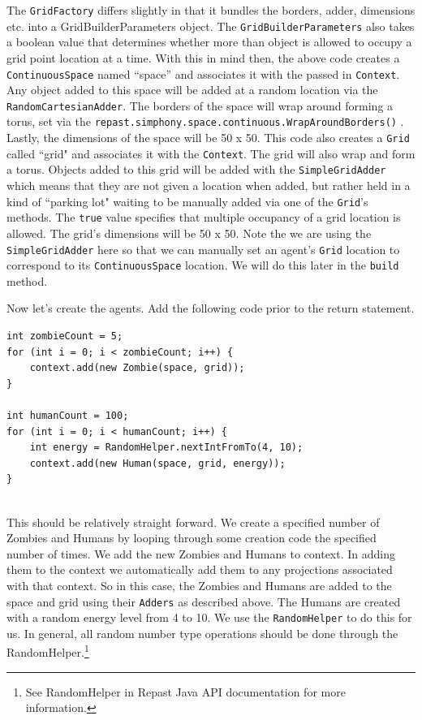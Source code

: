 \documentclass[11pt]{amsart}
\begin{document}
\vspace{.2in}
The \texttt{GridFactory} differs slightly in that it bundles the borders, adder, dimensions etc. into a GridBuilderParameters object. The \texttt{GridBuilderParameters} also takes a boolean value that determines whether more than object is allowed to occupy a grid point location at a time. With this in mind then, the above code creates a \texttt{ContinuousSpace} named ``space'' and associates it with the passed in \texttt{Context}. Any object added to this space will be added at a random location via the \texttt{RandomCartesianAdder}. The borders of the space will wrap around forming a torus, set via the  \texttt{repast.simphony.space.continuous.WrapAroundBorders()} . Lastly, the dimensions of the space will be 50 x 50. This code also creates a \texttt{Grid} called ``grid" and associates it with the \texttt{Context}. The grid will also wrap and form a torus. Objects added to this grid will be added with the \texttt{SimpleGridAdder} which means that they are not given a location when added, but rather held in a kind of ``parking lot" waiting to be manually added via one of the \texttt{Grid}'s methods. The \texttt{true} value specifies that multiple occupancy of a grid location is allowed. The grid's dimensions will be 50 x 50. Note the we are using the  \texttt{SimpleGridAdder} here so that we can manually set an agent's \texttt{Grid} location to correspond to its \texttt{ContinuousSpace} location. We will do this later in the \texttt{build} method.

Now let's create the agents. Add the following code prior to the return statement.

\noindent\begin{minipage}[h]{\textwidth}
\vspace{.2in}
\lstset{language=java,caption=JZombiesBuilder.build 2}
\begin{lstlisting}
int zombieCount = 5;
for (int i = 0; i < zombieCount; i++) {
	context.add(new Zombie(space, grid));
}

int humanCount = 100;
for (int i = 0; i < humanCount; i++) {
	int energy = RandomHelper.nextIntFromTo(4, 10);
	context.add(new Human(space, grid, energy));
}


\end{lstlisting}
\vspace{.2in}
\end{minipage}

This should be relatively straight forward. We create a specified number of Zombies and Humans by looping through some creation code the specified number of times. We add the new Zombies and Humans to context. In adding them to the context we automatically add them to any projections associated with that context. So in this case, the Zombies and Humans are added to the space and grid using their \texttt{Adders} as described above. The Humans are created with a random energy level from 4 to 10. We use the \texttt{RandomHelper} to do this for us. In general, all random number type operations should be done through the RandomHelper.\footnote{See  RandomHelper in Repast Java API documentation for more information.}
\end{document}
